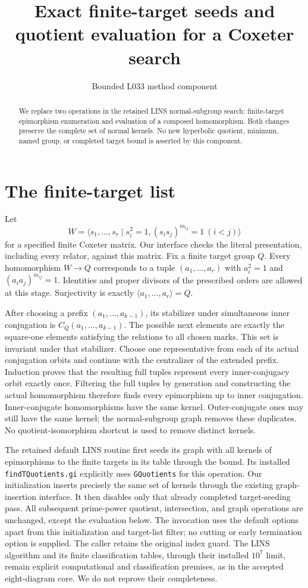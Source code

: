 \documentclass[11pt]{article}
\title{Exact finite-target seeds and quotient evaluation for a Coxeter search}
\author{Bounded L033 method component}\date{}
\begin{document}
\maketitle
\begin{abstract}
We replace two operations in the retained LINS normal-subgroup search:
finite-target epimorphism enumeration and evaluation of a composed
homomorphism. Both changes preserve the complete set of normal kernels.
No new hyperbolic quotient, minimum, named group, or completed target bound
is asserted by this component.
\end{abstract}

\section{The finite-target list}
Let
\[
 W=\langle s_1,\ldots,s_r\mid s_i^2=1,
       (s_i s_j)^{m_{ij}}=1\ (i<j)\rangle
\]
for a specified finite Coxeter matrix. Our interface checks the literal
presentation, including every relator, against this matrix. Fix a finite
target group $Q$. Every homomorphism $W\to Q$ corresponds to a tuple
$(a_1,\ldots,a_r)$ with $a_i^2=1$ and
$(a_i a_j)^{m_{ij}}=1$. Identities and proper divisors of the prescribed
orders are allowed at this stage. Surjectivity is exactly
$\langle a_1,\ldots,a_r\rangle=Q$.

After choosing a prefix $(a_1,\ldots,a_{k-1})$, its stabilizer under
simultaneous inner conjugation is
$C_Q(a_1,\ldots,a_{k-1})$. The possible next elements are exactly the
square-one elements satisfying the relations to all chosen marks. This
set is invariant under that stabilizer. Choose one representative from
each of its actual conjugation orbits and continue with the centralizer
of the extended prefix. Induction proves that the resulting full tuples
represent every inner-conjugacy orbit exactly once. Filtering the full
tuples by generation and constructing the actual homomorphism therefore
finds every epimorphism up to inner conjugation. Inner-conjugate
homomorphisms have the same kernel. Outer-conjugate ones may still have
the same kernel; the normal-subgroup graph removes these duplicates.
No quotient-isomorphism shortcut is used to remove distinct kernels.

The retained default LINS routine first seeds its graph with all kernels
of epimorphisms to the finite targets in its table through the bound.
Its installed \texttt{findTQuotients.gi} explicitly uses
\texttt{GQuotients} for this operation. Our initialization inserts
precisely the same set of kernels through the existing graph-insertion
interface. It then disables only that already completed target-seeding
pass. All subsequent prime-power quotient, intersection, and graph
operations are unchanged, except the evaluation below. The invocation
uses the default options apart from this initialization and target-list
filter; no cutting or early termination option is supplied. The caller
retains the original index guard. The LINS algorithm and its finite
classification tables, through their installed $10^7$ limit, remain
explicit computational and classification premises, as in the accepted
eight-diagram core. We do not reprove their completeness.
\end{document}
